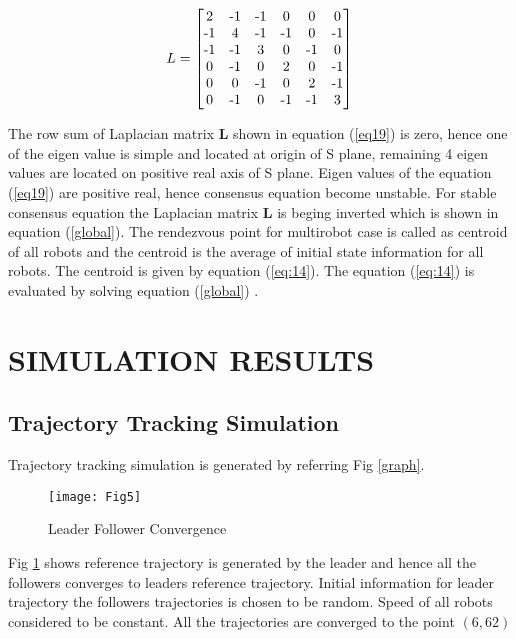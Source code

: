 \documentclass[twocolumn]{IETEJR}
\begin{document}
\begin{center}
	\begin{equation}
	L=\begin{bmatrix}
	2 & $-$1 & $-$1 & 0  & 0 & 0\\
	$-$ 1 &  4 & $-$1 & $-$1 & 0 & $-$1\\
	$-$ 1 & $-$1 &  3 & 0  & $-$1 & 0\\
	0 & $-$1 &  0 & 2  & 0 & $-$1\\
	0 &  0 & $-$1 & 0  & 2 & $-$1\\
	0 & $-$1 &  0 & $-$1 & $-$1 & 3\\
	\end{bmatrix} 
	\label{eq19}
	\end{equation}
\end{center}
The row sum of Laplacian matrix \textbf{L} shown in equation (\ref{eq19}) is zero, hence one of the eigen value is simple and located at origin of S plane, remaining 4 eigen values are located on positive real axis of S plane. Eigen values of the equation (\ref{eq19}) are positive real, hence consensus equation become unstable. For stable consensus equation the Laplacian matrix \textbf{L} is beging inverted which is shown in equation (\ref{global}). The rendezvous point for multirobot case is called as centroid of all robots and the centroid is the average of initial state information for all robots. The centroid is given by equation (\ref{eq:14}). The equation (\ref{eq:14}) is evaluated by solving equation (\ref{global}) . 
\section{SIMULATION RESULTS}
\subsection{Trajectory Tracking Simulation}
Trajectory tracking simulation is generated by referring Fig \ref{graph}.
\begin{figure}[h]
	\texttt{[image: Fig5]}
	\caption{Leader Follower Convergence}
	\label{plot1}
\end{figure}
Fig \ref{plot1} shows reference trajectory is generated by the leader and hence all the followers converges to leaders reference trajectory. Initial information for leader trajectory the followers trajectories is chosen to be random. Speed of all robots considered to be constant. All the trajectories are converged to the point $(6,62)$ 
\end{document}
